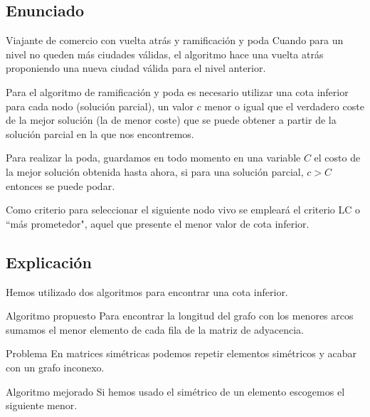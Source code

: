\subsection{Enunciado}
\begin{frame}
	\begin{block}{Viajante de comercio con vuelta atrás y ramificación y poda}
	Cuando para un nivel no queden más ciudades válidas, el algoritmo hace una vuelta atrás 
	proponiendo una nueva ciudad válida para el nivel anterior.

	Para el algoritmo de ramificación y poda es necesario utilizar una cota inferior para cada nodo 
	(solución parcial), un valor $c$ menor o igual que el verdadero coste de la mejor solución (la de 
	menor coste) que se puede obtener a partir de la solución parcial en la que nos encontremos.

	Para realizar la poda, guardamos en todo momento en una variable $C$ el costo de la mejor solución
	obtenida hasta ahora, si para una solución parcial, $c>C$ entonces se puede podar.

	Como criterio para seleccionar el siguiente nodo vivo se empleará el criterio LC o 
	``más prometedor", aquel que presente el menor valor de cota inferior.
	\end{block}
\end{frame}


\subsection{Explicación}
	
\begin{frame}
Hemos utilizado dos algoritmos para encontrar una cota inferior.
	
	\begin{block}{Algoritmo propuesto}
	Para encontrar la longitud del grafo con los menores arcos sumamos el menor elemento de cada fila de la matriz de adyacencia.
	\end{block}
	
	\begin{alertblock}{Problema}
	En matrices simétricas podemos repetir elementos simétricos y acabar con un grafo inconexo.
	\end{alertblock}
	
	\begin{block}{Algoritmo mejorado}
	Si hemos usado el simétrico de un elemento escogemos el siguiente menor.
	\end{block}
\end{frame}

